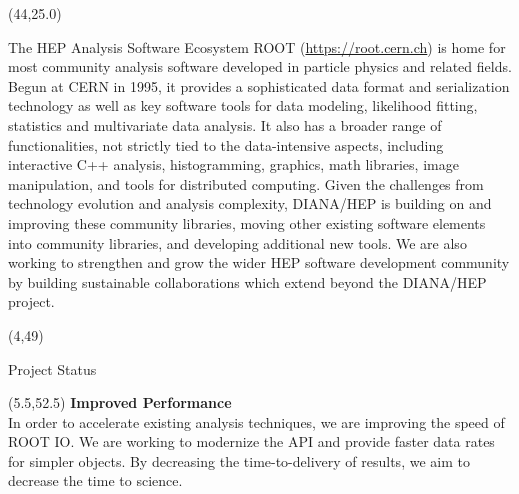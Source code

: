 \documentclass[final]{beamer}
\begin{document}
\begin{frame}{}
\begin{textblock}{38.0}(44,25.0)
\begin{block}{The HEP Analysis Software Ecosystem}
ROOT (\href{https://root.cern.ch}{https://root.cern.ch}) is
home for most community analysis
software developed in particle physics and related fields. Begun at CERN in 1995,
it provides a sophisticated data format and serialization technology
as well as key software tools for
data modeling, likelihood fitting, statistics and
multivariate data analysis. It also has a broader range of
functionalities, not strictly tied to the data-intensive aspects,
including interactive C++ analysis, histogramming,
graphics, math libraries, image manipulation,
and tools for distributed computing. 
Given the challenges from technology evolution and analysis complexity,
DIANA/HEP is building on and improving these
community libraries, moving other existing software elements into
community libraries, and developing additional new tools. We are also working to strengthen and grow the wider HEP software development community by building sustainable collaborations which extend beyond the DIANA/HEP project.
\end{block}
\end{textblock}





\begin{textblock}{78.0}(4,49)
\begin{block}{Project Status}
\end{block}
\end{textblock}

\begin{textblock}{22.5}(5.5,52.5)
\textcolor{mybluelabel}{\bf Improved Performance} \\
In order to accelerate existing analysis techniques, we are improving the speed of ROOT IO.
We are working to modernize the API
and provide faster data rates for simpler objects.
By decreasing the time-to-delivery of results, we aim to decrease the time to science.
\end{textblock}


\end{frame}
\end{document}
